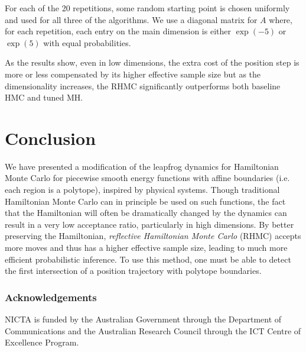 \documentclass{article} %
\begin{document}
For each of the 20 repetitions, some random starting point is chosen uniformly and used for all three of the algorithms.  We use a diagonal matrix for $A$ where, for each repetition, each entry on the main dimension is either $\exp(-5)$ or $\exp(5)$ with equal probabilities.

As the results show, even in low dimensions, the extra cost of the position step is more or less compensated by its higher effective sample size but as the dimensionality increases, the RHMC significantly outperforms both baseline HMC and tuned MH.

\section{Conclusion}

We have presented a modification of the leapfrog dynamics for Hamiltonian Monte Carlo for piecewise smooth energy functions with affine boundaries (i.e. each region is a polytope), inspired by physical systems.  Though traditional Hamiltonian Monte Carlo can in principle be used on such functions, the fact that the Hamiltonian will often be dramatically changed by the dynamics can result in a very low acceptance ratio, particularly in high dimensions.  By better preserving the Hamiltonian, \emph{reflective Hamiltonian Monte Carlo} (RHMC) accepts more moves and thus has a higher effective sample size, leading to much more efficient probabilistic inference.  To use this method, one must be able to detect the first intersection of a position trajectory with polytope boundaries.


\subsubsection*{Acknowledgements}
NICTA is funded by the Australian Government through the Department of Communications and the Australian Research Council through the ICT Centre of Excellence Program.







\end{document}
